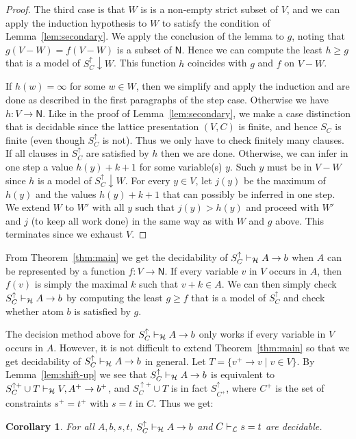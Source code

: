\documentclass[11pt,a4paper]{article}
\newtheorem{corollary}{Corollary}[theorem]
\newcommand{\N}{\mathsf{N}}
\newcommand\set[1]{\{#1\}}
\newcommand\lathy{{\cal L}}
\newcommand\prvL{\vdash_{\lathy}}
\newcommand\prvH{\vdash_{\cal H}}
\begin{document}
\begin{proof}
The third case is that $W$ is is a non-empty strict 
subset of $V$, and we can apply the induction
hypothesis to $W$ to satisfy the condition of 
Lemma~\ref{lem:secondary}. We apply the conclusion of 
the lemma to $g$, noting that $g(V-W)=f(V-W)$ is
a subset of $\N$. Hence we can compute the least 
$h\geq g$ that is a model of $S^\uparrow_C{\downarrow}W$.
This function $h$ coincides with $g$ and $f$ on $V-W$. 

If $h(w) = \infty$ for some $w\in W$, 
then we simplify and apply the induction and are done 
as described in the first paragraphs of the step case.
Otherwise we have $h: V\to\N$.
Like in the proof of Lemma~\ref{lem:secondary},
we make a case distinction that is decidable since
the lattice presentation $(V,C)$ is finite,
and hence $S_C$ is finite (even though $S^\uparrow_C$ is not).
Thus we only have to check finitely many clauses.
If all clauses in $S^\uparrow_C$ are satisfied by $h$ then we are done.
Otherwise, we can infer in one step a value $h(y)+k+1$ 
for some variable(s) $y$. Such $y$ must be in $V-W$ 
since $h$ is a model of $S^\uparrow_C{\downarrow}W$.
For every $y\in V$, let $j(y)$ be the maximum of $h(y)$
and the values $h(y)+k+1$ that can possibly
be inferred in one step.
We extend $W$ to $W'$ with all $y$ such that $j(y)>h(y)$ 
and proceed with $W'$ and $j$ (to keep all work done)
in the same way as with $W$ and $g$ above.
This terminates since we exhaust $V$.
\end{proof}


From Theorem~\ref{thm:main} we get the decidability of $S^\uparrow_C\prvH A\to b$
when $A$ can be represented by a function $f: V\to\N$. If every
variable $v$ in $V$ occurs in $A$, then $f(v)$ is simply
the maximal $k$ such that $v+k \in A$. We can then simply check
$S^\uparrow_C\prvH A\to b$ by computing the least $g\geq f$ that is
a model of $S^\uparrow_C$ and check whether atom $b$ is satisfied by $g$.

The decision method above for $S^\uparrow_C\prvH A\to b$ only works
if every variable in $V$ occurs in $A$.
However, it is not difficult to extend Theorem~\ref{thm:main}
so that we get decidability of $S^\uparrow_C\prvH A\to b$ in general. 
{\color{red} Let $T=\set{v^+\to v \mid v\in V}$. By Lemma~\ref{lem:shift-up}
we see that $S^\uparrow_C\prvH A\to b$ is equivalent to
$S^{\uparrow+}_C \cup T \prvH V,A^+ \to b^+$, and
$S^{\uparrow+}_C \cup T$ is in fact $S^{\uparrow}_{C^+}$, where
$C^+$ is the set of constraints $s^+ = t^+$ with $s=t$ in $C$.
} Thus we get:

\begin{corollary}\label{cor:decidability}
For all $A,b,s,t$, $S^\uparrow_C\prvH A\to b$ and $C\prvL s=t$ are decidable.
\end{corollary}
\end{document}
